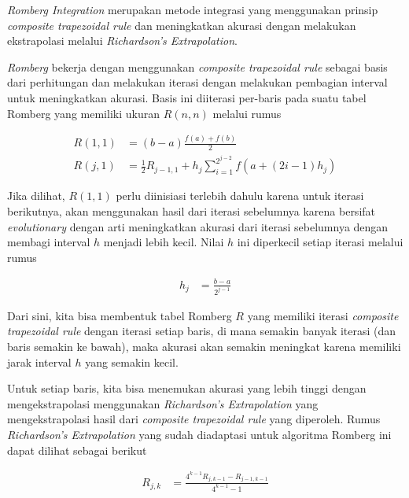 \documentclass[journal,12pt,onecolumn,a4paper]{IEEEtran}
\begin{document}
\begin{enumerate}
	      \emph{Romberg Integration} merupakan metode integrasi yang menggunakan prinsip \emph{composite trapezoidal rule} dan meningkatkan akurasi dengan melakukan ekstrapolasi melalui \emph{Richardson's Extrapolation}.

	      \emph{Romberg} bekerja dengan menggunakan \emph{composite trapezoidal rule} sebagai basis dari perhitungan dan melakukan iterasi dengan melakukan pembagian interval untuk meningkatkan akurasi. Basis ini diiterasi per-baris pada suatu tabel Romberg yang memiliki ukuran \(R(n,n)\) melalui rumus

	      \begin{equation*}
		      \begin{split}
			      R(1,1) & = (b-a)\frac{f(a)+f(b)}{2} \\
			      R(j,1) & = \frac{1}{2}R_{j-1,1}+h_j\sum_{i=1}^{2^{j-2}}f(a+(2i-1)h_j)
		      \end{split}
	      \end{equation*}

	      Jika dilihat, \(R(1,1)\) perlu diinisiasi terlebih dahulu karena untuk iterasi berikutnya, akan menggunakan hasil dari iterasi sebelumnya karena bersifat \emph{evolutionary} dengan arti meningkatkan akurasi dari iterasi sebelumnya dengan membagi interval \(h\) menjadi lebih kecil. Nilai \(h\) ini diperkecil setiap iterasi melalui rumus

	      \begin{equation*}
		      \begin{split}
			      h_j & = \frac{b-a}{2^{j-1}}
		      \end{split}
	      \end{equation*}

	      Dari sini, kita bisa membentuk tabel Romberg \(R\) yang memiliki iterasi \emph{composite trapezoidal rule} dengan iterasi setiap baris, di mana semakin banyak iterasi (dan baris semakin ke bawah), maka akurasi akan semakin meningkat karena memiliki jarak interval \(h\) yang semakin kecil.

	      Untuk setiap baris, kita bisa menemukan akurasi yang lebih tinggi dengan mengekstrapolasi menggunakan \emph{Richardson's Extrapolation} yang mengekstrapolasi hasil dari \emph{composite trapezoidal rule} yang diperoleh. Rumus \emph{Richardson's Extrapolation} yang sudah diadaptasi untuk algoritma Romberg ini dapat dilihat sebagai berikut

	      \begin{equation*}
		      \begin{split}
			      R_{j,k} & = \frac{4^{k-1}R_{j,k-1}-R_{j-1,k-1}}{4^{k-1}-1}
		      \end{split}
	      \end{equation*}


\end{enumerate}
\end{document}
